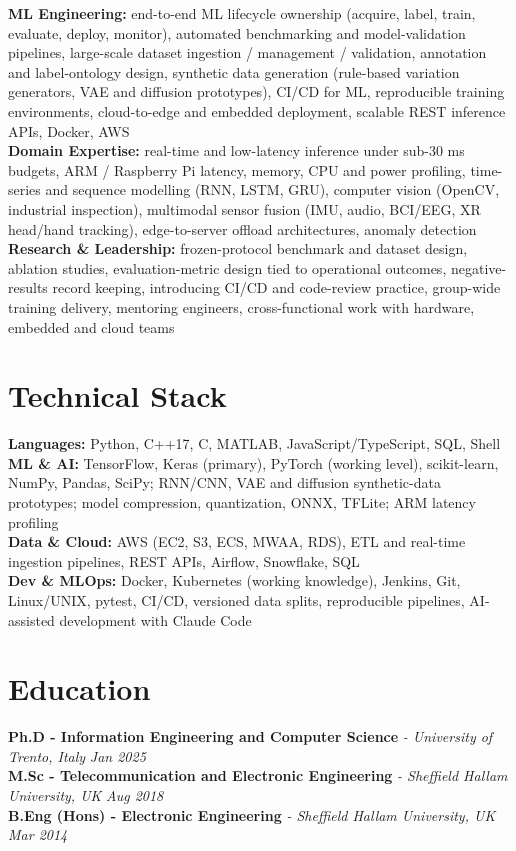 \documentclass[11pt]{article}
\begin{document}
\textbf{ML Engineering:} end-to-end ML lifecycle ownership (acquire, label, train, evaluate, deploy, monitor), automated benchmarking and model-validation pipelines, large-scale dataset ingestion / management / validation, annotation and label-ontology design, synthetic data generation (rule-based variation generators, VAE and diffusion prototypes), CI/CD for ML, reproducible training environments, cloud-to-edge and embedded deployment, scalable REST inference APIs, Docker, AWS\\
\textbf{Domain Expertise:} real-time and low-latency inference under sub-30 ms budgets, ARM / Raspberry Pi latency, memory, CPU and power profiling, time-series and sequence modelling (RNN, LSTM, GRU), computer vision (OpenCV, industrial inspection), multimodal sensor fusion (IMU, audio, BCI/EEG, XR head/hand tracking), edge-to-server offload architectures, anomaly detection\\
\textbf{Research \& Leadership:} frozen-protocol benchmark and dataset design, ablation studies, evaluation-metric design tied to operational outcomes, negative-results record keeping, introducing CI/CD and code-review practice, group-wide training delivery, mentoring engineers, cross-functional work with hardware, embedded and cloud teams

\section*{Technical Stack}

\textbf{Languages:} Python, C++17, C, MATLAB, JavaScript/TypeScript, SQL, Shell\\
\textbf{ML \& AI:} TensorFlow, Keras (primary), PyTorch (working level), scikit-learn, NumPy, Pandas, SciPy; RNN/CNN, VAE and diffusion synthetic-data prototypes; model compression, quantization, ONNX, TFLite; ARM latency profiling\\
\textbf{Data \& Cloud:} AWS (EC2, S3, ECS, MWAA, RDS), ETL and real-time ingestion pipelines, REST APIs, Airflow, Snowflake, SQL\\
\textbf{Dev \& MLOps:} Docker, Kubernetes (working knowledge), Jenkins, Git, Linux/UNIX, pytest, CI/CD, versioned data splits, reproducible pipelines, AI-assisted development with Claude Code

\section*{Education}
\textbf{Ph.D - Information Engineering and Computer Science} \textit{\small{ - University of Trento, Italy}} \hfill \textit{Jan 2025}\\[3pt]
\noindent\textbf{M.Sc - Telecommunication and Electronic Engineering} \textit{\small{ - Sheffield Hallam University, UK}} \hfill \textit{Aug 2018}\\[3pt]
\noindent\textbf{B.Eng (Hons) - Electronic Engineering} \textit{\small{ - Sheffield Hallam University, UK}} \hfill \textit{Mar 2014}
\end{document}

